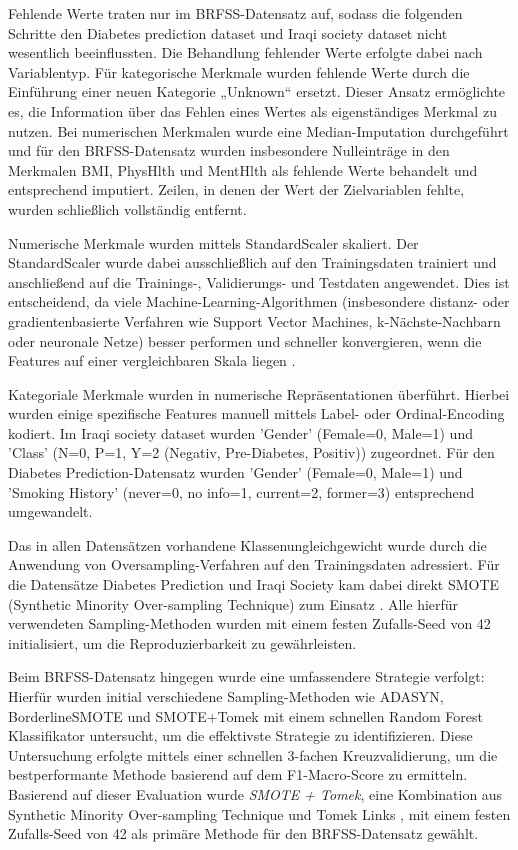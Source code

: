 \documentclass[10pt]{scrartcl}
\begin{document}
Fehlende Werte traten nur im BRFSS-Datensatz auf, sodass die folgenden Schritte den Diabetes prediction dataset und Iraqi society dataset nicht wesentlich beeinflussten. Die Behandlung fehlender Werte erfolgte dabei nach Variablentyp. Für kategorische Merkmale wurden fehlende Werte durch die Einführung einer neuen Kategorie „Unknown“ ersetzt. Dieser Ansatz ermöglichte es, die Information über das Fehlen eines Wertes als eigenständiges Merkmal zu nutzen. Bei numerischen Merkmalen wurde eine Median-Imputation durchgeführt und für den BRFSS-Datensatz wurden insbesondere Nulleinträge in den Merkmalen BMI, PhysHlth und MentHlth als fehlende Werte behandelt und entsprechend imputiert. Zeilen, in denen der Wert der Zielvariablen fehlte, wurden schließlich vollständig entfernt. 

Numerische Merkmale wurden mittels StandardScaler skaliert. Der StandardScaler wurde dabei ausschließlich auf den Trainingsdaten trainiert und anschließend auf die Trainings-, Validierungs- und Testdaten angewendet. Dies ist entscheidend, da viele Machine-Learning-Algorithmen (insbesondere distanz- oder gradientenbasierte Verfahren wie Support Vector Machines, k-Nächste-Nachbarn oder neuronale Netze) besser performen und schneller konvergieren, wenn die Features auf einer vergleichbaren Skala liegen \cite{sklearn_user_guide_ch7_3_1}.

Kategoriale Merkmale wurden in numerische Repräsentationen überführt. Hierbei wurden einige spezifische Features manuell mittels Label- oder Ordinal-Encoding kodiert. Im Iraqi society dataset wurden 'Gender' (Female=0, Male=1) und 'Class' (N=0, P=1, Y=2 (Negativ, Pre-Diabetes, Positiv)) zugeordnet. Für den Diabetes Prediction-Datensatz wurden 'Gender' (Female=0, Male=1) und 'Smoking History' (never=0, no info=1, current=2, former=3) entsprechend umgewandelt.


Das in allen Datensätzen vorhandene Klassenungleichgewicht wurde durch die Anwendung von Oversampling-Verfahren auf den Trainingsdaten adressiert. Für die Datensätze Diabetes Prediction und Iraqi Society kam dabei direkt SMOTE (Synthetic Minority Over-sampling Technique) zum Einsatz \cite{Chawla2002}. Alle hierfür verwendeten Sampling-Methoden wurden mit einem festen Zufalls-Seed von 42 initialisiert, um die Reproduzierbarkeit zu gewährleisten.

Beim BRFSS-Datensatz hingegen wurde eine umfassendere Strategie verfolgt: Hierfür wurden initial verschiedene Sampling-Methoden wie ADASYN, BorderlineSMOTE und SMOTE+Tomek mit einem schnellen Random Forest Klassifikator untersucht, um die effektivste Strategie zu identifizieren. Diese Untersuchung erfolgte mittels einer schnellen 3-fachen Kreuzvalidierung, um die bestperformante Methode basierend auf dem F1-Macro-Score zu ermitteln. Basierend auf dieser Evaluation wurde \textit{SMOTE + Tomek}, eine Kombination aus Synthetic Minority Over-sampling Technique und Tomek Links \cite{Tomek1976}, mit einem festen Zufalls-Seed von 42 als primäre Methode für den BRFSS-Datensatz gewählt.
\end{document}
